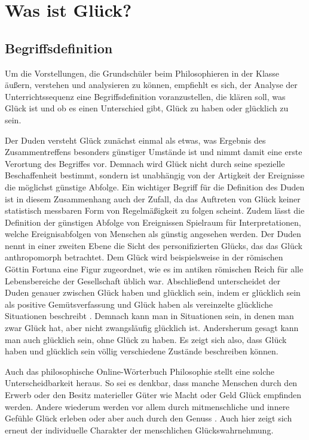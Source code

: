 \section{Was ist Glück?}
\subsection{Begriffsdefinition}

Um die Vorstellungen, die Grundschüler beim Philosophieren in der Klasse äußern, verstehen und analysieren zu können, empfiehlt es sich, der Analyse der Unterrichtssequenz eine Begriffsdefinition voranzustellen, die klären soll, was Glück ist und ob es einen Unterschied gibt, Glück zu \glqq haben\grqq{} oder \glqq glücklich\grqq{} zu sein.

Der Duden versteht Glück zunächst einmal als \glqq etwas, was Ergebnis des Zusammentreffens besonders günstiger Umstände ist\grqq{} \cite{D16} und nimmt damit eine erste Verortung des Begriffes vor. 
Demnach wird Glück nicht durch seine spezielle Beschaffenheit bestimmt, sondern ist unabhängig von der Artigkeit der Ereignisse die möglichst günstige Abfolge.
 Ein wichtiger Begriff für die Definition des Duden ist in diesem Zusammenhang auch der Zufall, da das Auftreten von Glück keiner statistisch messbaren Form von Regelmäßigkeit zu folgen scheint. 
 Zudem lässt die Definition der \glqq günstigen Abfolge von Ereignissen\grqq{} Spielraum für Interpretationen, welche Ereignisabfolgen von Menschen als günstig angesehen werden.  
 Der Duden nennt in einer zweiten Ebene die Sicht des personifizierten Glücks, das das Glück anthropomorph betrachtet. 
 Dem Glück wird beispielsweise in der römischen Göttin Fortuna eine Figur zugeordnet, wie es im antiken römischen Reich für alle Lebensbereiche der Gesellschaft üblich war. 
 Abschließend unterscheidet der Duden genauer zwischen Glück haben und glücklich sein, indem er \glqq glücklich sein\grqq{} als positive Gemütsverfassung und \glqq Glück haben\grqq{} als vereinzelte glückliche Situationen beschreibt \cite{D16}.
  Demnach kann man in Situationen sein, in denen man zwar Glück hat, aber nicht zwangsläufig glücklich ist. 
 Andersherum gesagt kann man auch glücklich sein, ohne Glück zu haben. 
 Es zeigt sich also, dass \glqq Glück haben\grqq{} und \glqq glücklich sein\grqq{} völlig verschiedene Zustände beschreiben können. 
 
Auch das philosophische Online-Wörterbuch Philosophie stellt eine solche Unterscheidbarkeit heraus. 
So sei es denkbar, dass manche Menschen durch den Erwerb oder den Besitz materieller Güter wie Macht oder Geld Glück empfinden werden. 
Andere wiederum werden vor allem durch mitmenschliche und innere Gefühle Glück erleben oder aber auch durch den Genuss \cite{GT16}. 
Auch hier zeigt sich erneut der individuelle Charakter der menschlichen Glückswahrnehmung. 

